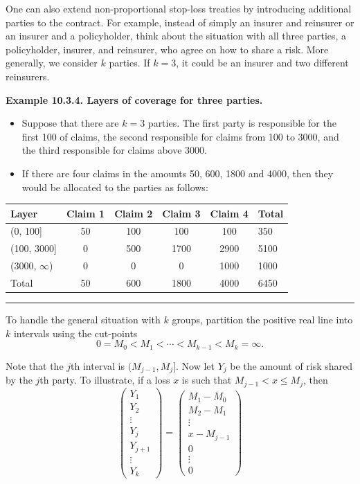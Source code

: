 \documentclass[]{book}
\theoremstyle{definition}
\theoremstyle{definition}
\theoremstyle{definition}
\theoremstyle{remark}
\begin{document}
One can also extend non-proportional stop-loss treaties by introducing
additional parties to the contract. For example, instead of simply an
insurer and reinsurer or an insurer and a policyholder, think about the
situation with all three parties, a policyholder, insurer, and
reinsurer, who agree on how to share a risk. More generally, we consider
\(k\) parties. If \(k=3\), it could be an insurer and two different
reinsurers.

\textbf{Example 10.3.4. Layers of coverage for three parties.}

\begin{itemize}
\item
  Suppose that there are \(k=3\) parties. The first party is responsible
  for the first 100 of claims, the second responsible for claims from
  100 to 3000, and the third responsible for claims above 3000.
\item
  If there are four claims in the amounts 50, 600, 1800 and 4000, then
  they would be allocated to the parties as follows:
\end{itemize}

\begin{longtable}[]{@{}lccccl@{}}
\toprule
Layer & Claim 1 & Claim 2 & Claim 3 & Claim 4 & Total\tabularnewline
\midrule
\endhead
(0, 100{]} & 50 & 100 & 100 & 100 & 350\tabularnewline
(100, 3000{]} & 0 & 500 & 1700 & 2900 & 5100\tabularnewline
(3000, \(\infty\)) & 0 & 0 & 0 & 1000 & 1000\tabularnewline
Total & 50 & 600 & 1800 & 4000 & 6450\tabularnewline
\bottomrule
\end{longtable}

\begin{center}\rule{0.5\linewidth}{\linethickness}\end{center}

To handle the general situation with \(k\) groups, partition the
positive real line into \(k\) intervals using the cut-points
\[0 = M_0 < M_1 < \cdots < M_{k-1} < M_k = \infty.\]

Note that the \(j\)th interval is \((M_{j-1}, M_j]\). Now let \(Y_j\) be
the amount of risk shared by the \(j\)th party. To illustrate, if a loss
\(x\) is such that \(M_{j-1} <x \le M_j\), then \[\left(\begin{array}{c}
    Y_1\\ Y_2 \\ \vdots \\ Y_j \\Y_{j+1} \\ \vdots \\Y_k
    \end{array}\right)
    =\left(\begin{array}{c}
    M_1-M_0 \\ M_2-M_1  \\ \vdots \\ x-M_{j-1}  \\ 0 \\ \vdots \\0
    \end{array}\right)\]
\end{document}

